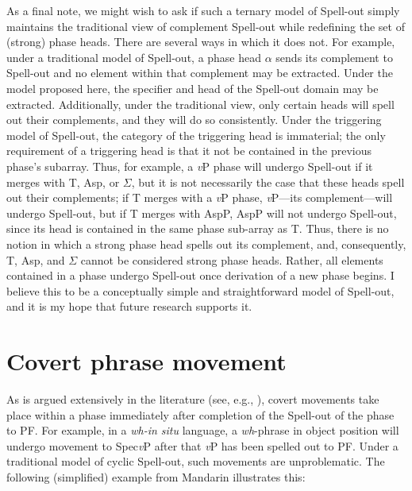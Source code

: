 As a final note, we might wish to ask if such a ternary model of Spell-out simply maintains the traditional view of complement Spell-out while redefining the set of (strong) phase heads. There are several ways in which it does not. For example, under a traditional model of Spell-out, a phase head $\alpha$ sends its complement to Spell-out and no element within that complement may be extracted. Under the model proposed here, the specifier and head of the Spell-out domain may be extracted. Additionally, under the traditional view, only certain heads will spell out their complements, and they will do so consistently. Under the triggering model of Spell-out, the category of the triggering head is immaterial; the only requirement of a triggering head is that it not be contained in the previous phase's subarray. Thus, for example, a {\it v}P phase will undergo Spell-out if it merges with T, Asp, or $\Sigma$, but it is not necessarily the case that these heads spell out their complements; if T merges with a {\it v}P phase, {\it v}P---its complement---will undergo Spell-out, but if T merges with AspP, AspP will not undergo Spell-out, since its head is contained in the same phase sub-array as T. Thus, there is no notion in which a strong phase head spells out its complement, and, consequently, T, Asp, and $\Sigma$ cannot be considered strong phase heads. Rather, all elements contained in a phase undergo Spell-out once derivation of a new phase begins. I believe this to be a conceptually simple and straightforward model of Spell-out, and it is my hope that future research supports it.

\section{Covert phrase movement}\label{covert_mov}
As is argued extensively in the literature (see, e.g., ), covert movements take place within a phase immediately after completion of the Spell-out of the phase to PF. For example, in a {\it wh-in situ} language, a {\it wh}-phrase in object position will undergo movement to Spec{\it v}P after that {\it v}P has been spelled out to PF. Under a traditional model of cyclic Spell-out, such movements are unproblematic. The following (simplified) example from Mandarin illustrates this:

